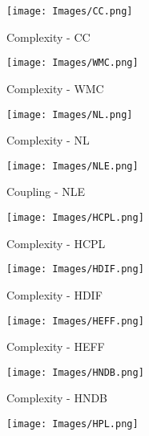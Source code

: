



\begin{figure*}
\centering
\begin{subfigure}{3.5cm}
\centering\texttt{[image: Images/CC.png]}
\caption{Complexity - CC}
\label{BP:Complexity-cc}
\end{subfigure}%
\begin{subfigure}{3.5cm}
\centering\texttt{[image: Images/WMC.png]}
\caption{Complexity - WMC}
\label{BP:Complexity-wmc}
\end{subfigure}%
\begin{subfigure}{3.5cm}
\centering\texttt{[image: Images/NL.png]}
\caption{Complexity - NL}
\label{BP:Complexity-nl}
\end{subfigure}%
\begin{subfigure}{3.5cm}
\centering\texttt{[image: Images/NLE.png]}
\caption{Coupling - NLE}
\label{BP:coupling-nle}
\end{subfigure}%
\vspace{9pt}
\begin{subfigure}{3.5cm}
\centering\texttt{[image: Images/HCPL.png]}
\caption{Complexity - HCPL}
\label{BP:Complexity-hcpl}
\end{subfigure}%
\begin{subfigure}{3.5cm}
\centering\texttt{[image: Images/HDIF.png]}
\caption{Complexity - HDIF}
\label{BP:Complexity-hdif}
\end{subfigure}%
\begin{subfigure}{3.5cm}
\centering\texttt{[image: Images/HEFF.png]}
\caption{Complexity - HEFF}
\label{BP:Complexityheff}
\end{subfigure}%
\begin{subfigure}{3.5cm}
\centering\texttt{[image: Images/HNDB.png]}
\caption{Complexity - HNDB}
\label{BP:Complexity-hndb}
\end{subfigure}%
\vspace{9pt}
\begin{subfigure}{3.5cm}
\centering\texttt{[image: Images/HPL.png]}

\end{subfigure}
\end{figure*}
